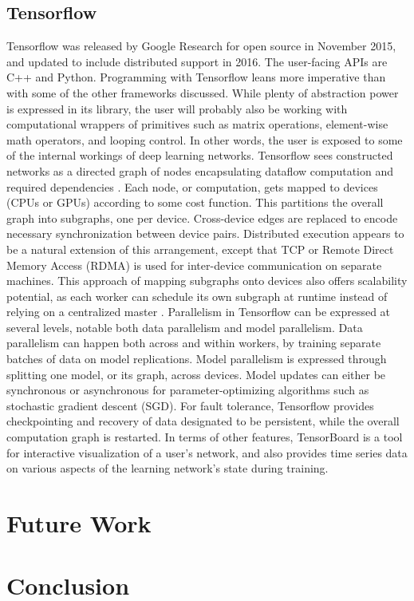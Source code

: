 \documentclass{article}
\begin{document}
\subsection{Tensorflow}
Tensorflow was released by Google Research for open source in November 2015, and updated to include distributed support in 2016. The user-facing APIs are C++ and Python. Programming with Tensorflow leans more imperative than with some of the other frameworks discussed. While plenty of abstraction power is expressed in its library, the user will probably also be working with computational wrappers of primitives such as matrix operations, element-wise math operators, and looping control. In other words, the user is exposed to some of the internal workings of deep learning networks. Tensorflow sees constructed networks as a directed graph of nodes encapsulating dataflow computation and required dependencies \cite{DBLP:journals/corr/AbadiABBCCCDDDG16}. Each node, or computation, gets mapped to devices (CPUs or GPUs) according to some cost function. This partitions the overall graph into subgraphs, one per device. Cross-device edges are replaced to encode necessary synchronization between device pairs. Distributed execution appears to be a natural extension of this arrangement, except that TCP or Remote Direct Memory Access (RDMA) is used for inter-device communication on separate machines. This approach of mapping subgraphs onto devices also offers scalability potential, as each worker can schedule its own subgraph at runtime instead of relying on a centralized master \cite{DBLP:journals/corr/AbadiABBCCCDDDG16}. Parallelism in Tensorflow can be expressed at several levels, notable both data parallelism and model parallelism. Data parallelism can happen both across and within workers, by training separate batches of data on model replications. Model parallelism is expressed through splitting one model, or its graph, across devices. Model updates can either be synchronous or asynchronous for parameter-optimizing algorithms such as stochastic gradient descent (SGD). For fault tolerance, Tensorflow provides checkpointing and recovery of data designated to be persistent, while the overall computation graph is restarted. In terms of other features, TensorBoard is a tool for interactive visualization of a user's network, and also provides time series data on various aspects of the learning network's state during training. 

\section{Future Work}
\section{Conclusion}

 

\end{document}
